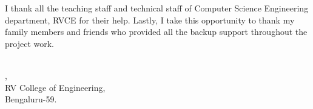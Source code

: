 I thank all the teaching staff and technical staff of Computer Science Engineering department, RVCE for their help. Lastly, I take this opportunity to thank my family members and friends who provided all the backup support throughout the project work.\par

\endgroup

\vspace{1cm}
\begin{flushright}
\textbf{\printStuNameA}\\ \vspace{-2pt}
\ifIDP \printGuideDeptAInLF\else\printDepartmentLF\fi, \\ \vspace{-2pt}
RV College of Engineering, \\ \vspace{-2pt}
Bengaluru-59.
\end{flushright}
